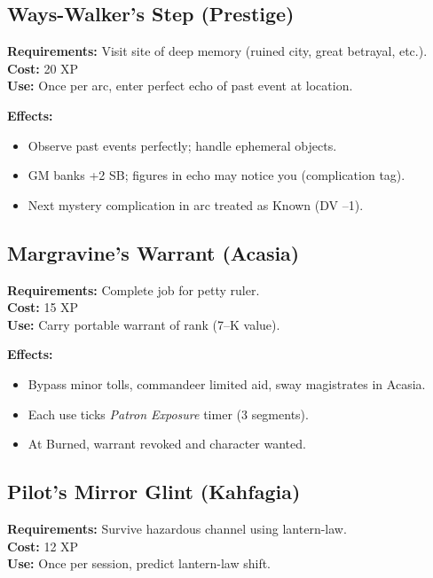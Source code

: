 \subsection{Ways-Walker's Step (Prestige)}\label{subsec:ways_walker}

\textbf{Requirements:} Visit site of deep memory (ruined city, great betrayal, etc.).\\
\textbf{Cost:} 20 XP\\
\textbf{Use:} Once per arc, enter perfect echo of past event at location.

\textbf{Effects:}
\begin{itemize}
    \item Observe past events perfectly; handle ephemeral objects.
    \item GM banks +2 SB; figures in echo may notice you (complication tag).
    \item Next mystery complication in arc treated as Known (DV --1).
\end{itemize}

\subsection{Margravine's Warrant (Acasia)}\label{subsec:margravine_warrant}

\textbf{Requirements:} Complete job for petty ruler.\\
\textbf{Cost:} 15 XP\\
\textbf{Use:} Carry portable warrant of rank (7--K value).

\textbf{Effects:}
\begin{itemize}
    \item Bypass minor tolls, commandeer limited aid, sway magistrates in Acasia.
    \item Each use ticks \emph{Patron Exposure} timer (3 segments).
    \item At Burned, warrant revoked and character wanted.
\end{itemize}

\subsection{Pilot's Mirror Glint (Kahfagia)}\label{subsec:pilot_mirror}

\textbf{Requirements:} Survive hazardous channel using lantern-law.\\
\textbf{Cost:} 12 XP\\
\textbf{Use:} Once per session, predict lantern-law shift.

